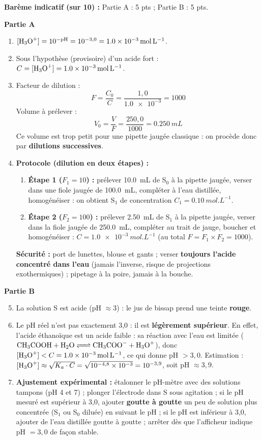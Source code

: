 \documentclass[11pt]{article}
\begin{document}
\begin{corrige}
\textbf{Barème indicatif (sur 10) :} Partie A : 5 pts ; Partie B : 5 pts.

\textbf{Partie A}
\begin{enumerate}
    \item $[\ce{H3O+}] = 10^{-\text{pH}} = 10^{-3,0} = \SI{1,0e-3}{mol.L^{-1}}$.
    \item Sous l'hypothèse (provisoire) d'un acide fort : $C = [\ce{H3O+}] = \SI{1,0e-3}{mol.L^{-1}}$.
    \item Facteur de dilution :
    \[ F = \frac{C_0}{C} = \frac{1{,}0}{\num{1,0e-3}} = 1000 \]
    Volume à prélever :
    \[ V_0 = \frac{V}{F} = \frac{250{,}0}{1000} = \SI{0,250}{mL} \]
    Ce volume est trop petit pour une pipette jaugée classique : on procède donc par \textbf{dilutions successives}.
    \item \textbf{Protocole (dilution en deux étapes) :}
    \begin{enumerate}
        \item \textbf{Étape 1 ($F_1 = 10$) :} prélever \SI{10,0}{mL} de S$_0$ à la pipette jaugée, verser dans une fiole jaugée de \SI{100,0}{mL}, compléter à l'eau distillée, homogénéiser : on obtient S$_1$ de concentration $C_1 = \SI{0,10}{mol.L^{-1}}$.
        \item \textbf{Étape 2 ($F_2 = 100$) :} prélever \SI{2,50}{mL} de S$_1$ à la pipette jaugée, verser dans la fiole jaugée de \SI{250,0}{mL}, compléter au trait de jauge, boucher et homogénéiser : $C = \SI{1,0e-3}{mol.L^{-1}}$ (au total $F = F_1 \times F_2 = 1000$).
    \end{enumerate}
    \textbf{Sécurité :} port de lunettes, blouse et gants ; verser \textbf{toujours l'acide concentré dans l'eau} (jamais l'inverse, risque de projections exothermiques) ; pipetage à la poire, jamais à la bouche.
\end{enumerate}

\textbf{Partie B}
\begin{enumerate}
    \setcounter{enumi}{4}
    \item La solution S est acide (pH $\approx 3$) : le jus de bissap prend une teinte \textbf{rouge}.
    \item Le pH réel n'est pas exactement 3,0 : il est \textbf{légèrement supérieur}. En effet, l'acide éthanoïque est un acide faible : sa réaction avec l'eau est limitée ($\ce{CH3COOH + H2O <=> CH3COO- + H3O+}$), donc $[\ce{H3O+}] < C = \SI{1,0e-3}{mol.L^{-1}}$, ce qui donne pH $> 3{,}0$. Estimation : $[\ce{H3O+}] \approx \sqrt{K_a \cdot C} = \sqrt{10^{-4,8} \times 10^{-3}} = 10^{-3,9}$, soit pH $\approx 3{,}9$.
    \item \textbf{Ajustement expérimental :} étalonner le pH-mètre avec des solutions tampons (pH 4 et 7) ; plonger l'électrode dans S sous agitation ; si le pH mesuré est supérieur à 3,0, ajouter \textbf{goutte à goutte} un peu de solution plus concentrée (S$_1$ ou S$_0$ diluée) en suivant le pH ; si le pH est inférieur à 3,0, ajouter de l'eau distillée goutte à goutte ; arrêter dès que l'afficheur indique pH $= 3{,}0$ de façon stable.
\end{enumerate}


\end{corrige}
\end{document}
